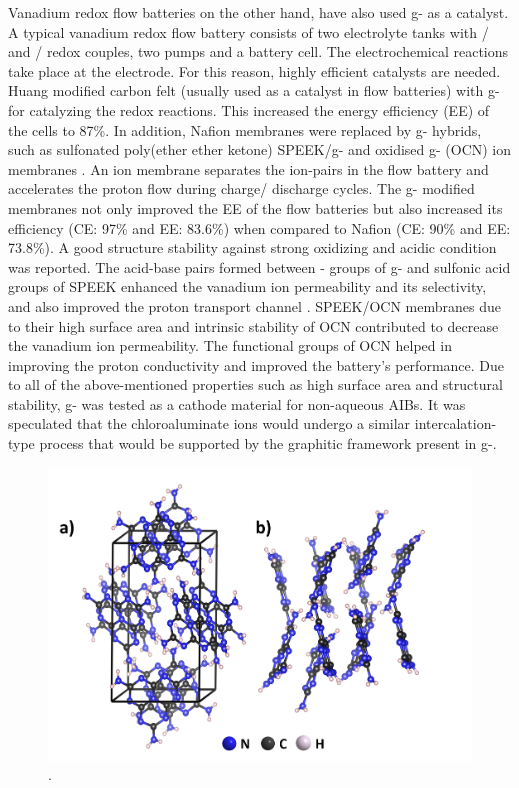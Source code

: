 Vanadium redox flow batteries on the other hand, have also used g- as a catalyst. A typical vanadium redox flow battery consists of two electrolyte tanks with / and / redox couples, two pumps and a battery cell. The electrochemical reactions take place at the electrode. For this reason, highly efficient catalysts are needed. Huang  modified carbon felt (usually used as a catalyst in flow batteries) with g- for catalyzing the redox reactions. This increased the energy efficiency (EE) of the cells to 87\%. In addition, Nafion membranes were replaced by g- hybrids, such as sulfonated poly(ether ether ketone) SPEEK/g- and oxidised g- (OCN) ion membranes \cite{niu_novel_2017, wang_novel_2017}. An ion membrane separates the ion-pairs in the flow battery and accelerates the proton flow during charge/ discharge cycles. The g- modified membranes not only improved the EE of the flow batteries but also increased its efficiency (CE: 97\% and EE: 83.6\%) when compared to Nafion (CE: 90\% and EE: 73.8\%). A good structure stability against strong oxidizing and acidic condition was reported. The acid-base pairs formed between - groups of g- and sulfonic acid groups of SPEEK enhanced the vanadium ion permeability and its selectivity, and also improved the proton transport channel \cite{wang_novel_2017}. SPEEK/OCN membranes due to their high surface area and intrinsic stability of OCN contributed to decrease the vanadium ion permeability. The functional groups of OCN helped in improving the proton conductivity and improved the battery's performance. Due to all of the above-mentioned properties such as high surface area and structural stability, g- was tested as a cathode material for non-aqueous AIBs. It was speculated that the chloroaluminate ions would undergo a similar intercalation-type process that would be supported by the graphitic framework present in g-.

\begin{figure}[th!]
\centering
\includegraphics[width=\textwidth]{Figures/chap6fig/C3N4crys}
\caption{.}
\label{Figures/chap6fig:C3N4crys}
\end{figure}
